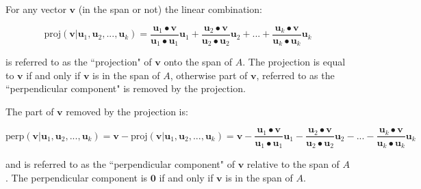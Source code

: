 \documentclass{article}
\begin{document}
For any vector \(\mathbf{v}\) (in the span or not) the linear combination:

\[\text{proj}(\mathbf{v} | \mathbf{u}_1, \mathbf{u}_2, ..., \mathbf{u}_k) = \frac{\mathbf{u}_1 \bullet \mathbf{v}}{\mathbf{u}_1 \bullet \mathbf{u}_1}\mathbf{u}_1 + \frac{\mathbf{u}_2 \bullet \mathbf{v}}{\mathbf{u}_2 \bullet \mathbf{u}_2}\mathbf{u}_2 + ... + \frac{\mathbf{u}_k \bullet \mathbf{v}}{\mathbf{u}_k \bullet \mathbf{u}_k}\mathbf{u}_k\]

is referred to as the ``projection" of \(\mathbf{v}\) onto the span of \(A\). The projection is equal to \(\mathbf{v}\) if and only if \(\mathbf{v}\) is in the span of \(A\), otherwise part of \(\mathbf{v}\), referred to as the ``perpendicular component" is removed by the projection.

The part of \(\mathbf{v}\) removed by the projection is:

\[\text{perp}(\mathbf{v} | \mathbf{u}_1, \mathbf{u}_2, ..., \mathbf{u}_k) = \mathbf{v} - \text{proj}(\mathbf{v} | \mathbf{u}_1, \mathbf{u}_2, ..., \mathbf{u}_k) = \mathbf{v} - \frac{\mathbf{u}_1 \bullet \mathbf{v}}{\mathbf{u}_1 \bullet \mathbf{u}_1}\mathbf{u}_1 - \frac{\mathbf{u}_2 \bullet \mathbf{v}}{\mathbf{u}_2 \bullet \mathbf{u}_2}\mathbf{u}_2 - ... - \frac{\mathbf{u}_k \bullet \mathbf{v}}{\mathbf{u}_k \bullet \mathbf{u}_k}\mathbf{u}_k\]

and is referred to as the ``perpendicular component" of \(\mathbf{v}\) relative to the span of \(A\). The perpendicular component is \(\mathbf{0}\) if and only if \(\mathbf{v}\) is in the span of \(A\).
\end{document}
